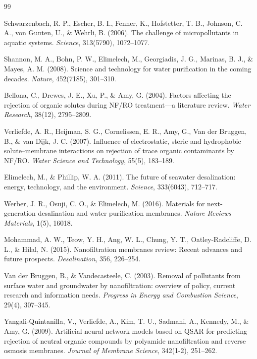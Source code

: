 \documentclass[11pt]{article}
\begin{document}
\begin{thebibliography}{99}

 Schwarzenbach, R. P., Escher, B. I., Fenner, K., Hofstetter, T. B., Johnson, C. A., von Gunten, U., \& Wehrli, B. (2006). The challenge of micropollutants in aquatic systems. \textit{Science}, 313(5790), 1072--1077.

 Shannon, M. A., Bohn, P. W., Elimelech, M., Georgiadis, J. G., Marinas, B. J., \& Mayes, A. M. (2008). Science and technology for water purification in the coming decades. \textit{Nature}, 452(7185), 301--310.

 Bellona, C., Drewes, J. E., Xu, P., \& Amy, G. (2004). Factors affecting the rejection of organic solutes during NF/RO treatment---a literature review. \textit{Water Research}, 38(12), 2795--2809.

 Verliefde, A. R., Heijman, S. G., Cornelissen, E. R., Amy, G., Van der Bruggen, B., \& van Dijk, J. C. (2007). Influence of electrostatic, steric and hydrophobic solute--membrane interactions on rejection of trace organic contaminants by NF/RO. \textit{Water Science and Technology}, 55(5), 183--189.

 Elimelech, M., \& Phillip, W. A. (2011). The future of seawater desalination: energy, technology, and the environment. \textit{Science}, 333(6043), 712--717.

 Werber, J. R., Osuji, C. O., \& Elimelech, M. (2016). Materials for next-generation desalination and water purification membranes. \textit{Nature Reviews Materials}, 1(5), 16018.

 Mohammad, A. W., Teow, Y. H., Ang, W. L., Chung, Y. T., Oatley-Radcliffe, D. L., \& Hilal, N. (2015). Nanofiltration membranes review: Recent advances and future prospects. \textit{Desalination}, 356, 226--254.

 Van der Bruggen, B., \& Vandecasteele, C. (2003). Removal of pollutants from surface water and groundwater by nanofiltration: overview of policy, current research and information needs. \textit{Progress in Energy and Combustion Science}, 29(4), 307--345.

 Yangali-Quintanilla, V., Verliefde, A., Kim, T. U., Sadmani, A., Kennedy, M., \& Amy, G. (2009). Artificial neural network models based on QSAR for predicting rejection of neutral organic compounds by polyamide nanofiltration and reverse osmosis membranes. \textit{Journal of Membrane Science}, 342(1-2), 251--262.


\end{thebibliography}
\end{document}
